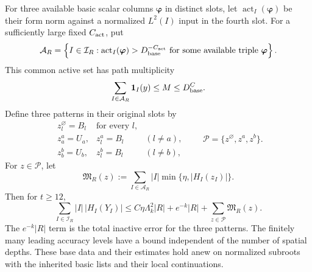 \begin{proposition}
For three available basic scalar columns \(\boldsymbol\varphi\) in
distinct slots, let \(\operatorname{act}_I(\boldsymbol\varphi)\)
be their form norm against a normalized \(L^2(I)\) input in the
fourth slot.  For a sufficiently large fixed \(C_{\rm act}\), put
\[
 \mathcal A_R=
 \left\{I\in\mathcal I_R:
   \operatorname{act}_I(\boldsymbol\varphi)>D_{\rm base}^{-C_{\rm act}}
   \text{ for some available triple }\boldsymbol\varphi\right\}.
\]
This common active set has path multiplicity
\[
 \sum_{I\in\mathcal A_R}\mathbf1_I(y)\le M\le D_{\rm base}^C.
\]
Define three patterns in their original slots by
\[
 \begin{array}{lll}
 z^\varnothing_l=B_l&\text{for every }l,\\
 z^a_a=U_a,&z^a_l=B_l& (l\ne a),\\
 z^b_b=U_b,&z^b_l=B_l& (l\ne b),
 \end{array}
 \qquad \mathcal P=\{z^\varnothing,z^a,z^b\}.
\]
For \(z\in\mathcal P\), let
\begin{equation}
 \mathfrak M_R(z)
 :=\sum_{I\in\mathcal A_R}|I|
       \min\{\eta,|H_I(z_I)|\}.                               \label{eq:h-active-pattern-target}
\end{equation}
Then for \(t\ge12\),
\begin{equation}
 \sum_{I\in\mathcal I_R}|I|\,|H_I(Y_I)|
 \le C\eta\Lambda_k^2|R|+e^{-k}|R|
       +\sum_{z\in\mathcal P}\mathfrak M_R(z).                 \label{eq:h-active-minimum}
\end{equation}
The \(e^{-k}|R|\) term is the total inactive error for the three
patterns.  The finitely many leading accuracy levels have a bound
independent of the number of spatial depths.  These base data and
their estimates hold anew on normalized subroots with the inherited
basic lists and their local continuations.
\end{proposition}

